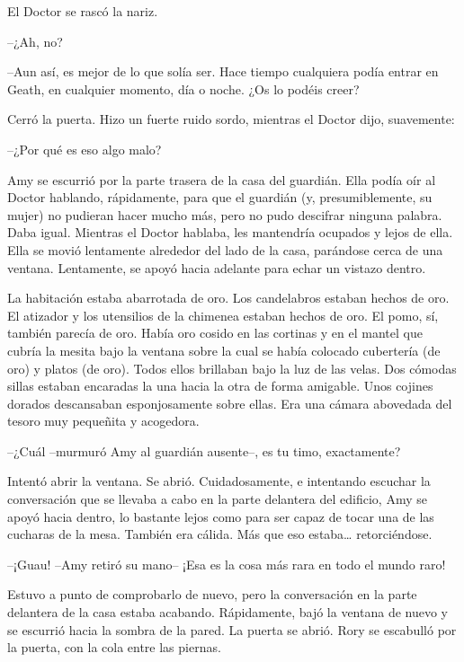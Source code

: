 {El Doctor se rascó la nariz.}

{--¿Ah, no?}

{--Aun así, es mejor de lo que solía ser. Hace tiempo cualquiera podía
	entrar en Geath, en cualquier momento, día o noche. ¿Os lo podéis
creer?}

{Cerró la puerta. Hizo un fuerte ruido sordo, mientras el Doctor dijo,
suavemente:}

{--¿Por qué es eso algo malo?}

\mbox{}

{Amy se escurrió por la parte trasera de la casa del guardián. Ella
	podía oír al Doctor hablando, rápidamente, para que el guardián (y,
	presumiblemente, su mujer) no pudieran hacer mucho más, pero no pudo
	descifrar ninguna palabra. Daba igual. Mientras el Doctor hablaba, les
	mantendría ocupados y lejos de ella. Ella se movió lentamente alrededor
	del lado de la casa, parándose cerca de una ventana. Lentamente, se
apoyó hacia adelante para echar un vistazo dentro.}

{La habitación estaba abarrotada de oro. Los candelabros estaban hechos
	de oro. El atizador y los utensilios de la chimenea estaban hechos de
	oro. El pomo, sí, también parecía de oro. Había oro cosido en las
	cortinas y en el mantel que cubría la mesita bajo la ventana sobre la
	cual se había colocado cubertería (de oro) y platos (de oro). Todos
	ellos brillaban bajo la luz de las velas. Dos cómodas sillas estaban
	encaradas la una hacia la otra de forma amigable. Unos cojines dorados
	descansaban esponjosamente sobre ellas. Era una cámara abovedada del
tesoro muy pequeñita y acogedora.}

{--¿Cuál --murmuró Amy al guardián ausente--, es tu timo,
exactamente?}

{Intentó abrir la ventana. Se abrió. Cuidadosamente, e intentando
	escuchar la conversación que se llevaba a cabo en la parte delantera del
	edificio, Amy se apoyó hacia dentro, lo bastante lejos como para ser
	capaz de tocar una de las cucharas de la mesa. También era cálida. Más
	que eso estaba\ldots{} retorciéndose.}

{--¡Guau! --Amy retiró su mano-- ¡Esa es la cosa más rara en todo el
mundo raro!}

{Estuvo a punto de comprobarlo de nuevo, pero la conversación en la
	parte delantera de la casa estaba acabando. Rápidamente, bajó la ventana
	de nuevo y se escurrió hacia la sombra de la pared. La puerta se abrió.
Rory se escabulló por la puerta, con la cola entre las piernas.}

